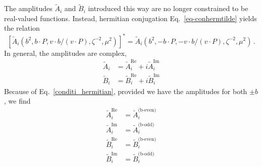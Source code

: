\documentclass[]{article}
\numberwithin{equation}{section}
\newcommand{\tcdot}{{\cdot}}
\newcommand{\tAmp}{\widetilde{A}}
\newcommand{\tBmp}{\widetilde{B}}
\newcommand{\elll}{b}
\begin{document}
The amplitudes $\tAmp_i$ and $\tBmp_i$ introduced this way are no longer constrained to be real-valued functions. Instead, hermitian conjugation Eq.\ \eqref{eq-conhermtilde} yields the relation
\begin{equation}
	\left[ \tAmp_i(\elll^2,\elll \tcdot P, v \tcdot \elll / (v \tcdot P), \zeta^{-2},\mu^2) \right]^* = \tAmp_i(\elll^2,-\elll \tcdot P, -v \tcdot \elll / (v \tcdot P), \zeta^{-2},\mu^2)\, .\label{conditi_hermitian}
\end{equation}
In general, the amplitudes are complex,
\begin{align}
    \tilde{A}_i&=\tilde{A}^{\text{Re}}_i+i\tilde{A}^{\text{Im}}_i\\
    \tilde{B}_i&=\tilde{B}^{\text{Re}}_i+i\tilde{B}^{\text{Im}}_i
\end{align}
Because of Eq.\ \eqref{conditi_hermitian}, provided we have the amplitudes for both $\pm b$, we find
\begin{align}
    \tilde{A}^{\text{Re}}_i&=\tilde{A}^{\text{(b-even)}}_i\\
    \tilde{A}^{\text{Im}}_i&=\tilde{A}^{\text{(b-odd})}_i\\
    \tilde{B}^{\text{Re}}_i&=\tilde{B}^{\text{(b-even)}}_i\\
    \tilde{B}^{\text{Im}}_i&=\tilde{B}^{\text{(b-odd})}_i
\end{align}
\end{document}
